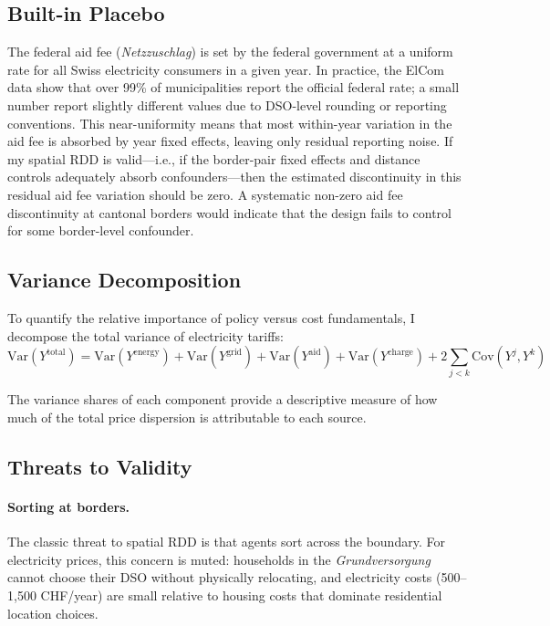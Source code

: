 \documentclass[12pt]{article}
\newcommand{\Var}{\text{Var}}
\newcommand{\Cov}{\text{Cov}}
\begin{document}
\subsection{Built-in Placebo}

The federal aid fee (\textit{Netzzuschlag}) is set by the federal government at a uniform rate for all Swiss electricity consumers in a given year. In practice, the ElCom data show that over 99\% of municipalities report the official federal rate; a small number report slightly different values due to DSO-level rounding or reporting conventions. This near-uniformity means that most within-year variation in the aid fee is absorbed by year fixed effects, leaving only residual reporting noise. If my spatial RDD is valid---i.e., if the border-pair fixed effects and distance controls adequately absorb confounders---then the estimated discontinuity in this residual aid fee variation should be zero. A systematic non-zero aid fee discontinuity at cantonal borders would indicate that the design fails to control for some border-level confounder.

\subsection{Variance Decomposition}

To quantify the relative importance of policy versus cost fundamentals, I decompose the total variance of electricity tariffs:
\begin{equation}
\Var(Y^{\text{total}}) = \Var(Y^{\text{energy}}) + \Var(Y^{\text{grid}}) + \Var(Y^{\text{aid}}) + \Var(Y^{\text{charge}}) + 2\sum_{j<k} \Cov(Y^j, Y^k)
\end{equation}

The variance shares of each component provide a descriptive measure of how much of the total price dispersion is attributable to each source.

\subsection{Threats to Validity}

\paragraph{Sorting at borders.} The classic threat to spatial RDD is that agents sort across the boundary. For electricity prices, this concern is muted: households in the \textit{Grundversorgung} cannot choose their DSO without physically relocating, and electricity costs (500--1,500 CHF/year) are small relative to housing costs that dominate residential location choices.
\end{document}
